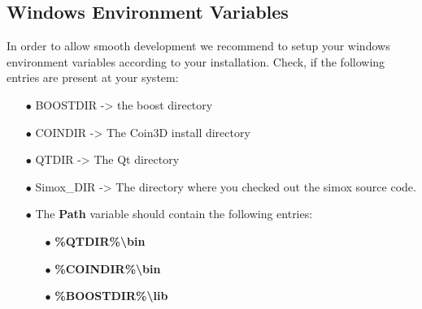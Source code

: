 \subsection{Windows Environment Variables}
In order to allow smooth development we recommend to setup your windows environment variables according to your installation. Check, if the following entries are present at your system: 
\begin{itemize}

\item[$\bullet$]BOOSTDIR -> the boost directory  
\item[$\bullet$]COINDIR -> The Coin3D install directory   
\item[$\bullet$]QTDIR -> The Qt directory 
\item[$\bullet$]Simox\_DIR -> The directory where you checked out the simox source code.  
\item[$\bullet$]The \textbf{Path} variable should contain the following entries:  
\begin{itemize}
\item[$\bullet$]\textbf{\%QTDIR\%\textbackslash bin}
\item[$\bullet$]\textbf{\%COINDIR\%\textbackslash bin}  
\item[$\bullet$]\textbf{\%BOOSTDIR\%\textbackslash lib}
\end{itemize}
\end{itemize}
